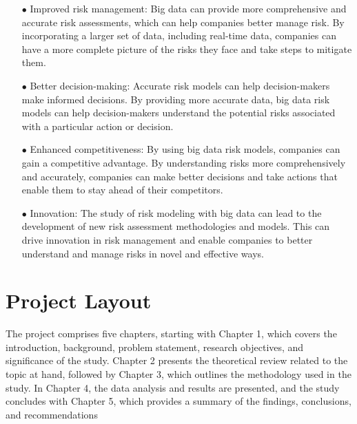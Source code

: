 \begin{itemize}
    \item[$\bullet$] Improved risk management: Big data can provide more comprehensive and accurate risk
assessments, which can help companies better manage risk. By incorporating a larger set
of data, including real-time data, companies can have a more complete picture of the risks
they face and take steps to mitigate them.
    \item[$\bullet$] Better decision-making: Accurate risk models can help decision-makers make informed
decisions. By providing more accurate data, big data risk models can help
decision-makers understand the potential risks associated with a particular action or
decision.
    \item[$\bullet$] Enhanced competitiveness: By using big data risk models, companies can gain a
competitive advantage. By understanding risks more comprehensively and accurately,
companies can make better decisions and take actions that enable them to stay ahead of
their competitors.
    \item[$\bullet$] Innovation: The study of risk modeling with big data can lead to the development of new
risk assessment methodologies and models. This can drive innovation in risk
management and enable companies to better understand and manage risks in novel and
effective ways.\par 
\end{itemize}


\section{Project Layout}

The project comprises five chapters, starting with Chapter 1, which covers the introduction, background,
 problem statement, research objectives, and significance of the study.
 Chapter 2 presents the theoretical review related to the topic at hand, followed by Chapter 3, which outlines 
 the methodology used in the study. In Chapter 4, the data analysis and results are presented, and the study 
 concludes with Chapter 5, which provides a summary of the findings, conclusions, and recommendations